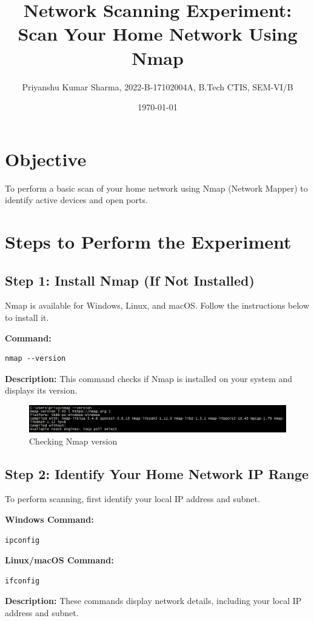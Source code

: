 \documentclass{article}
\title{Network Scanning Experiment: Scan Your Home Network Using Nmap}
\author{Priyanshu Kumar Sharma, 2022-B-17102004A, B.Tech CTIS, SEM-VI/B}
\date{\today}
\begin{document}
\maketitle

\section{Objective}
To perform a basic scan of your home network using Nmap (Network Mapper) to identify active devices and open ports.

\section{Steps to Perform the Experiment}

\subsection{Step 1: Install Nmap (If Not Installed)}
Nmap is available for Windows, Linux, and macOS. Follow the instructions below to install it.

\textbf{Command:}
\begin{lstlisting}
nmap --version
\end{lstlisting}
\textbf{Description:} This command checks if Nmap is installed on your system and displays its version.

\begin{figure}[h]
    \centering
    \includegraphics[width=1.0\textwidth, height=1.0\textheight, keepaspectratio]{images/nmap_version.png}
    \caption{Checking Nmap version}
\end{figure}

\subsection{Step 2: Identify Your Home Network IP Range}
To perform scanning, first identify your local IP address and subnet.

\textbf{Windows Command:}
\begin{lstlisting}
ipconfig
\end{lstlisting}
\textbf{Linux/macOS Command:}
\begin{lstlisting}
ifconfig
\end{lstlisting}
\textbf{Description:} These commands display network details, including your local IP address and subnet.
\end{document}
